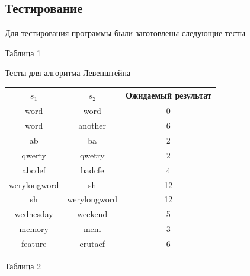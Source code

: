 \documentclass[a4paper,12pt]{article}
\begin{document}
\subsection{Тестирование}

Для тестирования программы были заготовлены следующие тесты

\hfill

\begin{flushright}
    Таблица 1
\end{flushright}

\begin{center}
    Тесты для алгоритма Левенштейна

    \begin{tabular}{|c|c|c|}
        \hline
        $s_1$ & $s_2$ & Ожидаемый результат \\
        \hline
        word & word & 0 \\
        \hline
        word & another & 6 \\
        \hline
        ab & ba & 2 \\
        \hline
        qwerty & qwetry & 2 \\
        \hline
        abcdef & badcfe & 4 \\
        \hline
        werylongword & sh & 12 \\
        \hline
        sh & werylongword & 12 \\
        \hline
        wednesday & weekend & 5 \\
        \hline
        memory & mem & 3 \\
        \hline
        feature & erutaef & 6 \\
        \hline
    \end{tabular}
\end{center}

\hfill

\begin{flushright}
    Таблица 2
\end{flushright}
\end{document}

